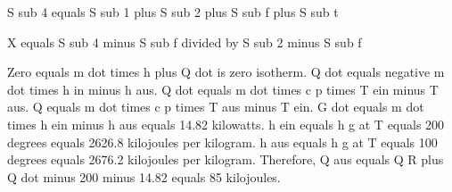 S sub 4 equals S sub 1 plus S sub 2 plus S sub f plus S sub t

X equals S sub 4 minus S sub f divided by S sub 2 minus S sub f

Zero equals m dot times h plus Q dot is zero isotherm. Q dot equals negative m dot times h in minus h aus. Q dot equals m dot times c p times T ein minus T aus. Q equals m dot times c p times T aus minus T ein. G dot equals m dot times h ein minus h aus equals 14.82 kilowatts. h ein equals h g at T equals 200 degrees equals 2626.8 kilojoules per kilogram. h aus equals h g at T equals 100 degrees equals 2676.2 kilojoules per kilogram. Therefore, Q aus equals Q R plus Q dot minus 200 minus 14.82 equals 85 kilojoules.